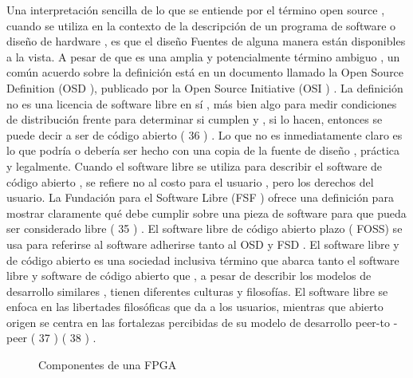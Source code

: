 Una interpretación sencilla de lo que se entiende por el término open source , cuando se utiliza en la
contexto de la descripción de un programa de software o diseño de hardware , es que el diseño
Fuentes de alguna manera están disponibles a la vista. A pesar de que es una amplia y potencialmente
término ambiguo , un común acuerdo sobre la definición está en un documento llamado
la Open Source Definition (OSD ), publicado por la Open Source Initiative (OSI ) .
La definición no es una licencia de software libre en sí , más bien algo para medir condiciones de distribución frente para determinar si cumplen y , si lo hacen, entonces se puede decir
a ser de código abierto ( 36 ) . Lo que no es inmediatamente claro es lo que podría o debería ser
hecho con una copia de la fuente de diseño , práctica y legalmente. Cuando el software libre
se utiliza para describir el software de código abierto , se refiere no al costo para el usuario ,
pero los derechos del usuario. La Fundación para el Software Libre (FSF ) ofrece una definición
para mostrar claramente qué debe cumplir sobre una pieza de software para que pueda ser considerado
libre ( 35 ) .
El software libre de código abierto plazo ( FOSS) se usa para referirse al software
adherirse tanto al OSD y FSD . El software libre y de código abierto es una sociedad inclusiva
término que abarca tanto el software libre y software de código abierto que , a pesar de
describir los modelos de desarrollo similares , tienen diferentes culturas y filosofías.
El software libre se enfoca en las libertades filosóficas que da a los usuarios, mientras que abierto
origen se centra en las fortalezas percibidas de su modelo de desarrollo peer-to -peer ( 37 ) ( 38 ) .





\begin{figure}[h!]
 \begin{center}
  \caption{Componentes de una FPGA}
  \label{fig:esquema}
 \end{center}
\end{figure}


